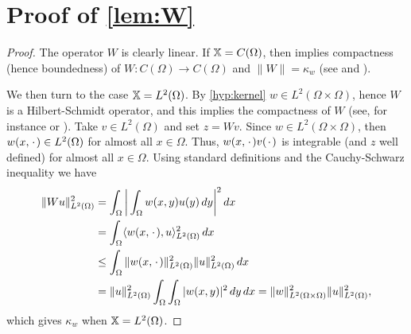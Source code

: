 \documentclass[a4paper,baskervaldx]{daarticle}
\begin{document}
\section{Proof of \texorpdfstring{\cref{lem:W}}{Lemma linear integral operator}}\label{app:proof:lem:W}
\begin{proof}
  The operator $W$ is clearly linear. If $\mathbb{X} = C(\Omega)$, then 
  implies compactness (hence boundedness) of $W \colon C(\Omega) \to C(\Omega)$ and
  $\| W \| = \kappa_w$ (see \cite[Section 2.8.1]{atkinson2005theoretical} and
  \cite[Section 1.2]{atkinson1997}).

  We then turn to the case $\mathbb{X} = L^2(\Omega)$. By \cref{hyp:kernel} $w \in
  L^2(\Omega \times \Omega)$, hence $W$ is a Hilbert-Schmidt operator, and this
  implies the compactness of $W$ (see, for instance \cite[Section 1.2]{atkinson1997}
  or \cite[online Chapter 8]{heil2018metrics}).
  Take $v \in L^2(\Omega)$ and set $z = Wv$. Since $w \in L^2(\Omega \times \Omega)$,
  then $w(x,{\mkern 2mu\cdot\mkern 2mu}) \in L^2(\Omega)$ for almost all $x \in \Omega$. Thus, $w(x,{\mkern 2mu\cdot\mkern 2mu}) v({\mkern 2mu\cdot\mkern 2mu})$ is integrable
  (and $z$ well defined) for almost all $x \in \Omega$. Using
  standard definitions and the Cauchy-Schwarz inequality we have
\[
  \begin{aligned}
    \| Wu \|^2_{L^2(\Omega)} & = \int_\Omega \bigg| \int_\Omega w(x,y) u(y) \, dy \bigg|^2 \, dx  \\
	       & = \int_\Omega \langle w(x,{\mkern 2mu\cdot\mkern 2mu}), u \rangle^2_{L^2(\Omega)} \, dx \\
	       &  \leq \int_\Omega \| w(x,{\mkern 2mu\cdot\mkern 2mu}) \|^2_{L^2(\Omega)} \| u \|^2_{L^2(\Omega)} \, dx \\
	       & = \| u \|^2_{L^2(\Omega)} \int_\Omega \int_\Omega |w(x,y)|^2  \, dy \, dx 
	       = \| w \|^2_{L^2(\Omega \times \Omega)} \| u \|^2_{L^2(\Omega)},
  \end{aligned}
\]
which gives $\kappa_w$ when $\mathbb{X} = L^2(\Omega)$.
\end{proof}
\end{document}

